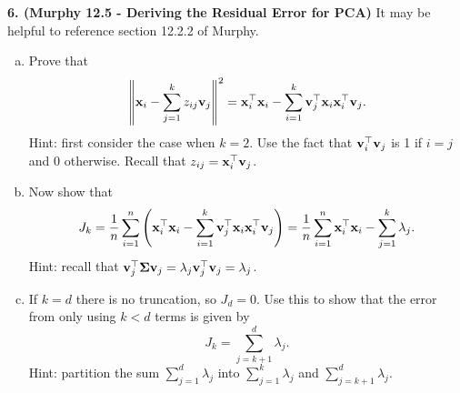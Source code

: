 \documentclass[12pt,letterpaper,fleqn]{hmcpset}
\begin{document}
\textbf{6. (Murphy 12.5 - Deriving the Residual Error for PCA)} It may be helpful to reference
section 12.2.2 of Murphy.
\begin{enumerate}[(a)]
    \item Prove that
        \[
            \left\|{\bf x}_i - \sum_{j=1}^k z_{ij}{\bf v}_j\right\|^2 = {\bf x}_i^\top{\bf x}_i - \sum_{i=1}^k{\bf v}_j^\top {\bf x}_i{\bf x}_i^\top {\bf v}_j.
        \]
        Hint: first consider the case when $k=2$. Use the fact that ${\bf v}_i^\top{\bf v}_j$ is 1 if $i=j$ and 0 otherwise.
        Recall that $z_{ij} = {\bf x}_i^\top{\bf v}_j$.

    \item Now show that
        \[
            J_k = \frac{1}{n}\sum_{i=1}^n \left({\bf x}_i^\top {\bf x}_i - \sum_{i=1}^k{\bf v}_j^\top {\bf x}_i{\bf x}_i^\top {\bf v}_j\right) = \frac{1}{n}\sum_{i=1}^n {\bf x}_i^\top{\bf x}_i - \sum_{j=1}^k\lambda_j.
        \]
        Hint: recall that ${\bf v}_j^\top \hbox{\boldmath$\Sigma$} {\bf v}_j = \lambda_j{\bf v}_j^\top{\bf v}_j = \lambda_j$.

    \item If $k=d$ there is no truncation, so $J_d=0$. Use this to show that the error from only using $k<d$
        terms is given by
        \[
            J_k = \sum_{j=k+1}^d \lambda_j.
        \]
        Hint: partition the sum $\sum_{j=1}^d \lambda_j$ into $\sum_{j=1}^k \lambda_j$ and $\sum_{j=k+1}^d \lambda_j$.
\end{enumerate}
\end{document}
